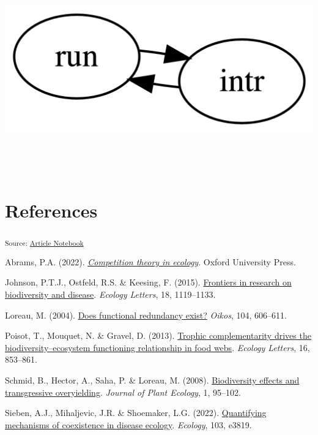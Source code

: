 \documentclass[
  letterpaper,
  DIV=11,
  numbers=noendperiod]{scrartcl}
\newlength{\cslhangindent}
\newenvironment{CSLReferences}[2] %
 {\begin{list}{}{%
  \setlength{\itemindent}{0pt}
  \setlength{\leftmargin}{0pt}
  \setlength{\parsep}{0pt}
  \ifodd #1
   \setlength{\leftmargin}{\cslhangindent}
   \setlength{\itemindent}{-1\cslhangindent}
  \fi
  \setlength{\itemsep}{#2\baselineskip}}}
 {\end{list}}
\begin{document}
\includegraphics[width=5.5in,height=3.5in]{index_files/figure-latex/dot-figure-1.png}

\section{References}

\textsubscript{Source:
\href{https://colebrookson.github.io/disease-overyield/index.qmd.html}{Article
Notebook}}

\label{refs}
\begin{CSLReferences}{1}{0}
Abrams, P.A. (2022).
\emph{\href{https://books.google.ca/books?hl=en&lr=&id=fTaFEAAAQBAJ&oi=fnd&pg=PP1&dq=abrams+2022+competition+theory&ots=_cdJwLVcq_&sig=ZUB2hKd4WD_YZsynGVHu114pnJ4}{Competition
theory in ecology}}. Oxford University Press.

Johnson, P.T.J., Ostfeld, R.S. \& Keesing, F. (2015).
\href{https://doi.org/10.1111/ele.12479}{Frontiers in research on
biodiversity and disease}. \emph{Ecology Letters}, 18, 1119--1133.

Loreau, M. (2004).
\href{https://doi.org/10.1111/j.0030-1299.2004.12685.x}{Does functional
redundancy exist?} \emph{Oikos}, 104, 606--611.

Poisot, T., Mouquet, N. \& Gravel, D. (2013).
\href{https://doi.org/10.1111/ele.12118}{Trophic complementarity drives
the biodiversity--ecosystem functioning relationship in food webs}.
\emph{Ecology Letters}, 16, 853--861.

Schmid, B., Hector, A., Saha, P. \& Loreau, M. (2008).
\href{https://academic.oup.com/jpe/article-abstract/1/2/95/989985}{Biodiversity
effects and transgressive overyielding}. \emph{Journal of Plant
Ecology}, 1, 95--102.

Sieben, A.J., Mihaljevic, J.R. \& Shoemaker, L.G. (2022).
\href{https://doi.org/10.1002/ecy.3819}{Quantifying mechanisms of
coexistence in disease ecology}. \emph{Ecology}, 103, e3819.

\end{CSLReferences}
\end{document}
